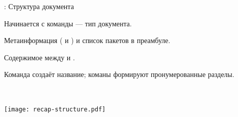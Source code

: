 \documentclass{beamer}
\begin{document}
\begin{frame}[fragile]{\insertsection: Структура документа}
\vspace{-3ex}
\begin{itemize}{\small
\item Начинается с команды  --- тип документа.
\item Метаинформация ( и ) и список пакетов в преамбуле.
\item Содержимое между  и .
\item Команда  создаёт название; команы 
формируют пронумерованные разделы.
}\end{itemize}
\vspace{-4ex}
\begin{minipage}{0.55\linewidth}
\end{minipage}~~%
\begin{minipage}{0.45\linewidth}
\texttt{[image: recap-structure.pdf]}
\end{minipage}
\end{frame}
\end{document}

